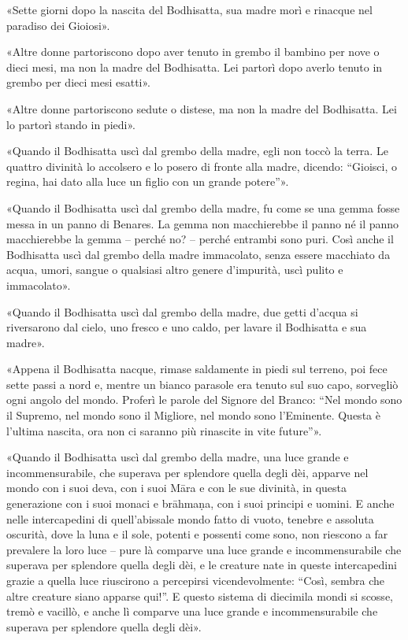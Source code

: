 «Sette giorni dopo la nascita del Bodhisatta, sua madre morì e rinacque nel
paradiso dei Gioiosi».

«Altre donne partoriscono dopo aver tenuto in grembo il bambino per nove o dieci
mesi, ma non la madre del Bodhisatta. Lei partorì dopo averlo tenuto in grembo
per dieci mesi esatti».

«Altre donne partoriscono sedute o distese, ma non la madre del Bodhisatta. Lei
lo partorì stando in piedi».

«Quando il Bodhisatta uscì dal grembo della madre, egli non toccò la terra. Le
quattro divinità lo accolsero e lo posero di fronte alla madre, dicendo:
“Gioisci, o regina, hai dato alla luce un figlio con un grande potere”».

«Quando il Bodhisatta uscì dal grembo della madre, fu come se una gemma fosse
messa in un panno di Benares. La gemma non macchierebbe il panno né il panno
macchierebbe la gemma – perché no? – perché entrambi sono puri. Così anche il
Bodhisatta uscì dal grembo della madre immacolato, senza essere macchiato da
acqua, umori, sangue o qualsiasi altro genere d’impurità, uscì pulito e
immacolato».

«Quando il Bodhisatta uscì dal grembo della madre, due getti d’acqua si
riversarono dal cielo, uno fresco e uno caldo, per lavare il Bodhisatta e sua
madre».

«Appena il Bodhisatta nacque, rimase saldamente in piedi sul terreno, poi fece
sette passi a nord e, mentre un bianco parasole era tenuto sul suo capo,
sorvegliò ogni angolo del mondo. Proferì le parole del Signore del Branco: “Nel
mondo sono il Supremo, nel mondo sono il Migliore, nel mondo sono l’Eminente.
Questa è l’ultima nascita, ora non ci saranno più rinascite in vite future”».

«Quando il Bodhisatta uscì dal grembo della madre, una luce grande e
incommensurabile, che superava per splendore quella degli dèi, apparve nel mondo
con i suoi deva, con i suoi Māra e con le sue divinità, in questa generazione
con i suoi monaci e brāhmaṇa, con i suoi principi e uomini. E anche nelle
intercapedini di quell’abissale mondo fatto di vuoto, tenebre e assoluta
oscurità, dove la luna e il sole, potenti e possenti come sono, non riescono a
far prevalere la loro luce – pure là comparve una luce grande e incommensurabile
che superava per splendore quella degli dèi, e le creature nate in queste
intercapedini grazie a quella luce riuscirono a percepirsi vicendevolmente:
“Così, sembra che altre creature siano apparse qui!”. E questo sistema di
diecimila mondi si scosse, tremò e vacillò, e anche lì comparve una luce grande
e incommensurabile che superava per splendore quella degli dèi».

